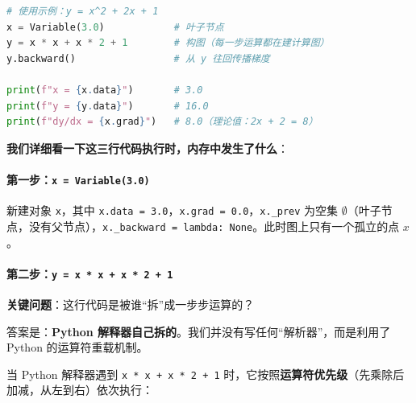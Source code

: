 \begin{lstlisting}[style=teaching, language=Python]
# 使用示例：y = x^2 + 2x + 1
x = Variable(3.0)            # 叶子节点
y = x * x + x * 2 + 1        # 构图（每一步运算都在建计算图）
y.backward()                 # 从 y 往回传播梯度

print(f"x = {x.data}")       # 3.0
print(f"y = {y.data}")       # 16.0
print(f"dy/dx = {x.grad}")   # 8.0（理论值：2x + 2 = 8）
\end{lstlisting}

\textbf{我们详细看一下这三行代码执行时，内存中发生了什么}：

\paragraph{第一步：\texttt{x = Variable(3.0)}}

新建对象 \texttt{x}，其中 \texttt{x.data = 3.0}，\texttt{x.grad = 0.0}，\texttt{x.\_prev} 为空集 $\emptyset$（叶子节点，没有父节点），\texttt{x.\_backward = lambda: None}。此时图上只有一个孤立的点 $x$。

\paragraph{第二步：\texttt{y = x * x + x * 2 + 1}}

\textbf{关键问题}：这行代码是被谁``拆''成一步步运算的？

答案是：\textbf{Python 解释器自己拆的}。我们并没有写任何``解析器''，而是利用了 Python 的运算符重载机制。

当 Python 解释器遇到 \texttt{x * x + x * 2 + 1} 时，它按照\textbf{运算符优先级}（先乘除后加减，从左到右）依次执行：

